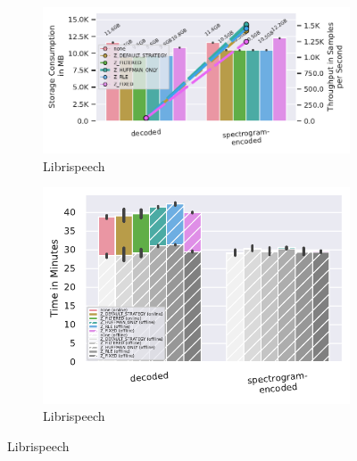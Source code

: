 \documentclass[sigconf,nonacm]{acmart}
\begin{document}
\begin{figure}[b]
  \begin{subfigure}{0.49 \columnwidth}
    \includegraphics[width=\linewidth]{../images/librispeech-strategy-pipeline/compressed-storage-vs-throughput.pdf}
    \caption{Librispeech}
    \Description{}
    \label{fig:zlib-librispeech-compressed-storage-vs-throughput}
  \end{subfigure}
  \hfill %
  \begin{subfigure}{0.49 \columnwidth}
    \includegraphics[width=\linewidth]{../images/librispeech-strategy-pipeline/compression-processing-time-split.pdf}
    \caption{Librispeech}
    \Description{}
    \label{fig:zlib-librispeech-compression-processing-time-split}
  \end{subfigure}
  

\end{figure}
\end{document}
